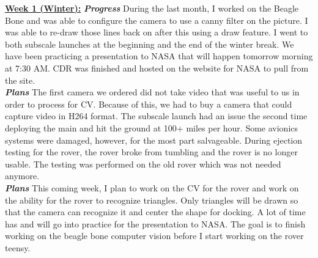 \documentclass[onecolumn, draftclsnofoot, 10pt, compsoc]{IEEEtran}
\begin{document}
\underline{\textbf{Week 1 (Winter):}}
\newline\textbf{\textit{{Progress}}}
\newline During the last month, I worked on the Beagle Bone and was able to configure the camera to use a canny filter on the picture. I was able to re-draw those lines back on after this using a draw feature. I went to both subscale launches at the beginning and the end of the winter break. We have been practicing a presentation to NASA that will happen tomorrow morning at 7:30 AM. CDR was finished and hosted on the website for NASA to pull from the site. \\
\newline\textbf{\textit{{Plans}}}
\newline The first camera we ordered did not take video that was useful to us in order to process for CV. Because of this, we had to buy a camera that could capture video in H264 format. The subscale launch had an issue the second time deploying the main and hit the ground at 100+ miles per hour. Some avionics systems were damaged, however, for the most part salvageable. During ejection testing for the rover, the rover broke from tumbling and the rover is no longer usable. The testing was performed on the old rover which was not needed anymore. \\
\newline\textbf{\textit{{Plans}}}
\newline This coming week, I plan to work on the CV for the rover and work on the ability for the rover to recognize triangles. Only triangles will be drawn so that the camera can recognize it and center the shape for docking. A lot of time has and will go into practice for the presentation to NASA. The goal is to finish working on the beagle bone computer vision before I start working on the rover teensy. \newline
\end{document}
